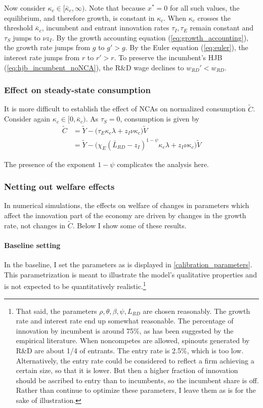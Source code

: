 \documentclass[12pt,english]{article}
\theoremstyle{remark}
\begin{document}
Now consider $\kappa_c \in [\bar{\kappa}_c,\infty)$. Note that because $x^* = 0$ for all such values, the equilibrium, and therefore growth, is constant in $\kappa_c$. When $\kappa_c$ crosses the threshold $\bar{\kappa}_c$, incumbent and entrant innovation rates $\tau_I,\tau_E$ remain constant and $\tau_S$ jumps to $\nu z_I$. By the growth accounting equation (\ref{eq:growth_accounting}), the growth rate jumps from $g$ to $g' > g$. By the Euler equation (\ref{eq:euler}), the interest rate jumps from $r$ to $r'>r$. To preserve the incumbent's HJB (\ref{eq:hjb_incumbent_noNCA}), the R\&D wage declines to $w_{RD}' < w_{RD}$.


\subsubsection{Effect on steady-state consumption}

It is more difficult to establish the effect of NCAs on normalized consumption $\tilde{C}$. Consider again $\kappa_c \in [0, \bar{\kappa}_c)$. As $\tau_S = 0$, consumption is given by 
\begin{align*}
	\tilde{C} &= \tilde{Y} - \Big( \tau_E  \kappa_e \lambda + z_I \nu \kappa_c \Big) \tilde{V} \\
	  &= \tilde{Y} - \Big( \chi_E (\bar{L}_{RD} - z_I)^{1-\psi} \kappa_e \lambda + z_I \nu \kappa_c \Big) \tilde{V}
\end{align*}

The presence of the exponent $1-\psi$ complicates the analysis here. 

\subsubsection{Netting out welfare effects}

In numerical simulations, the effects on welfare of changes in parameters which affect the innovation part of the economy are driven by changes in the growth rate, not changes in $\tilde{C}$. Below I show some of these results.

\paragraph{Baseline setting} In the baseline, I set the parameters as is displayed in \autoref{calibration_parameters}. This parametrization is meant to illustrate the model's qualitative properties and is not expected to be quantitatively realistic.\footnote{That said, the parameters $\rho, \theta, \beta, \psi, L_{RD}$ are chosen reasonably. The growth rate and interest rate end up somewhat reasonable. The percentage of innovation by incumbent is around 75\%, as has been suggested by the empirical literature. When noncompetes are allowed, spinouts generated by R\&D are about 1/4 of entrants. The entry rate is 2.5\%, which is too low. Alternatively, the entry rate could be considered to reflect a firm achieving a certain size, so that it is lower. But then a higher fraction of innovation should be ascribed to entry than to incumbents, so the incumbent share is off. Rather than continue to optimize these parameters, I leave them as is for the sake of illustration.}
\end{document}
